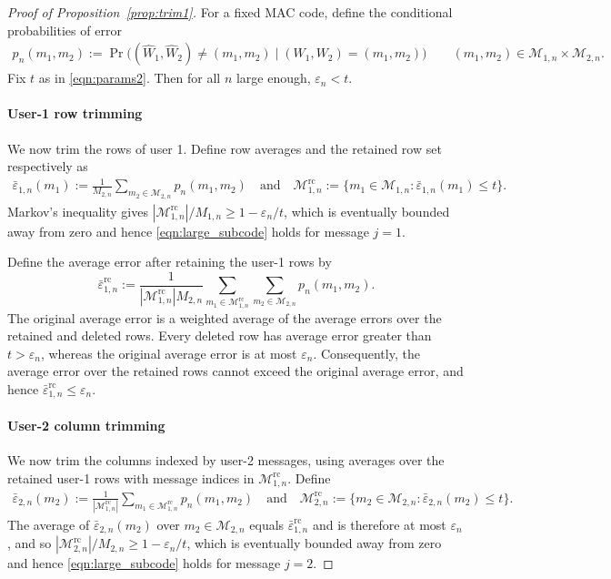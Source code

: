 \documentclass[11pt,onecolumn]{IEEEtran}
\newcommand{\calM}{\mathcal{M}}
\newcommand{\hatW}{\hat{W}}
\newcommand{\eps}{\varepsilon}
\newcommand{\rc}{\mathrm{rc}}
\begin{document}
\begin{proof}[Proof of Proposition~\ref{prop:trim1}]
For a fixed MAC code, define the conditional probabilities of error 
\begin{align}
p_n(m_1, m_2) :=\Pr \Big( (\hatW_1, \hatW_2) \ne (m_1,m_2) \mid  (W_1,W_2) =(m_1,m_2)\Big)\qquad (m_1,m_2)\in \calM_{1,n}\times \calM_{2,n}.
\end{align}
Fix $t$ as in \eqref{eqn:params2}. Then for all $n$ large enough, $\eps_n<t$.


\paragraph{User-1 row trimming} We now trim the rows of user 1. 
Define row averages  and the retained row set respectively as 
\begin{align}
\bar{\eps}_{1,n}(m_1):=\frac{1}{M_{2,n}}\sum_{m_2 \in \calM_{2,n}}p_n(m_1, m_2)\quad\mbox{and}\quad \calM_{1,n}^{\rc}:= \big\{m_1 \in \calM_{1,n}: \bar{\eps}_{1,n}(m_1)\le t\big\}. \label{eqn:M1rc}
\end{align}
Markov's inequality gives $|\calM_{1,n}^{\rc}|/M_{1,n}\ge 1-\eps_n/t$, which is eventually bounded away from zero and hence \eqref{eqn:large_subcode} holds for message $j=1$.

Define the average error after retaining the user-1 rows by
\begin{equation}
\bar{\eps}_{1,n}^\rc :=
\frac{1}{|\calM_{1,n}^{\rc}|M_{2,n}}
\sum_{m_1\in\calM_{1,n}^{\rc}}
\sum_{m_2\in\calM_{2,n}}
p_n(m_1,m_2).
\end{equation}
The original average error is a weighted average of the average errors
over the retained and deleted rows. Every deleted row has average error
greater than \(t>\eps_n\), whereas the original average error is at most
\(\eps_n\). Consequently, the average error over the retained rows cannot
exceed the original average error, and hence
$
\bar{\eps}_{1,n}^\rc\le \eps_n.
$

\paragraph{User-2 column trimming} We now trim the columns indexed by user-2 messages, using averages over the retained user-1 rows with message indices in $\calM_{1,n}^{\rc}$.
Define
\begin{align}
\bar{\eps}_{2,n}(m_2):=\frac{1}{|\calM_{1,n}^{\rc}|}\sum_{m_1\in \calM_{1,n}^{\rc}}p_n(m_1,m_2)\quad\mbox{and}\quad \calM_{2,n}^{\rc}:=\big\{m_2\in \calM_{2,n}: \bar{\eps}_{2,n}(m_2)\le t\big\}. \label{eqn:M2rc}
\end{align}
The average of   $\bar{\eps}_{2,n}(m_2)$ over $m_2\in\calM_{2,n}$  equals $\bar{\eps}_{1,n}^\rc$ and is therefore at most $\eps_n$, and so $| \calM_{2,n}^{\rc}| /M_{2,n}\ge 1-\eps_n/t$, which is eventually bounded away from zero and hence \eqref{eqn:large_subcode} holds for message $j=2$.


\end{proof}
\end{document}

